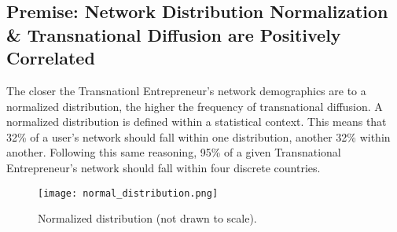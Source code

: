 \subsection{Premise: Network Distribution Normalization \& Transnational Diffusion are Positively Correlated}
The closer the Transnationl Entrepreneur's network demographics are to a normalized distribution, the higher the frequency of transnational diffusion. A normalized distribution is defined within a statistical context. This means that 32\% of a user's network should fall within one distribution, another 32\% within another. Following this same reasoning, 95\% of a given Transnational Entrepreneur's network should fall within four discrete countries.
\begin{figure}[!ht]
  \centering
  \texttt{[image: normal\_distribution.png]}
  \caption{Normalized distribution (not drawn to scale).}
\end{figure}
